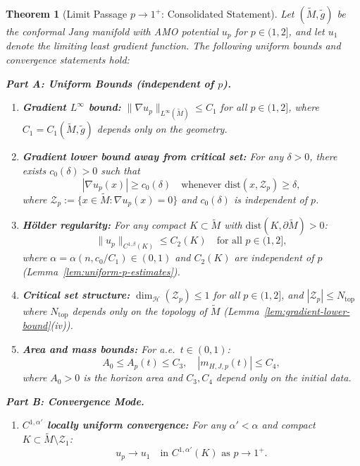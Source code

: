 \documentclass[12pt]{article}
\theoremstyle{plain}
\newtheorem{theorem}{Theorem}[section]
\theoremstyle{definition}
\theoremstyle{remark}
\newcommand{\tM}{\tilde{M}}
\newcommand{\tg}{\tilde{g}}
\begin{document}
\begin{theorem}[Limit Passage $p \to 1^+$: Consolidated Statement]\label{thm:limit-passage}
Let $(\tM, \tg)$ be the conformal Jang manifold with AMO potential $u_p$ for $p \in (1, 2]$, and let $u_1$ denote the limiting least gradient function. The following uniform bounds and convergence statements hold:

\smallskip
\noindent\textbf{Part A: Uniform Bounds (independent of $p$).}
\begin{enumerate}
    \item[(U1)] \textbf{Gradient $L^\infty$ bound:} $\|\nabla u_p\|_{L^\infty(\tM)} \leq C_1$ for all $p \in (1, 2]$, where $C_1 = C_1(\tM, \tg)$ depends only on the geometry.
    
    \item[(U2)] \textbf{Gradient lower bound away from critical set:} For any $\delta > 0$, there exists $c_0(\delta) > 0$ such that
    \[
    |\nabla u_p(x)| \geq c_0(\delta) \quad \text{whenever } \mathrm{dist}(x, \mathcal{Z}_p) \geq \delta,
    \]
    where $\mathcal{Z}_p := \{x \in \tM : \nabla u_p(x) = 0\}$ and $c_0(\delta)$ is independent of $p$.
    
    \item[(U3)] \textbf{H\"older regularity:} For any compact $K \subset \tM$ with $\mathrm{dist}(K, \partial\tM) > 0$:
    \[
    \|u_p\|_{C^{1,\beta}(K)} \leq C_2(K) \quad \text{for all } p \in (1, 2],
    \]
    where $\alpha = \alpha(n, c_0/C_1) \in (0, 1)$ and $C_2(K)$ are independent of $p$ (Lemma~\ref{lem:uniform-p-estimates}).
    
    \item[(U4)] \textbf{Critical set structure:} $\dim_{\mathcal{H}}(\mathcal{Z}_p) \leq 1$ for all $p \in (1, 2]$, and $|\mathcal{Z}_p| \leq N_{\mathrm{top}}$ where $N_{\mathrm{top}}$ depends only on the topology of $\tM$ (Lemma~\ref{lem:gradient-lower-bound}(iv)).
    
    \item[(U5)] \textbf{Area and mass bounds:} For a.e.\ $t \in (0, 1)$:
    \[
    A_0 \leq A_p(t) \leq C_3, \quad |m_{H,J,p}(t)| \leq C_4,
    \]
    where $A_0 > 0$ is the horizon area and $C_3, C_4$ depend only on the initial data.
\end{enumerate}

\smallskip
\noindent\textbf{Part B: Convergence Mode.}
\begin{enumerate}
    \item[(C1)] \textbf{$C^{1,\alpha'}$ locally uniform convergence:} For any $\alpha' < \alpha$ and compact $K \subset \tM \setminus \mathcal{Z}_1$:
    \[
    u_p \to u_1 \quad \text{in } C^{1,\alpha'}(K) \text{ as } p \to 1^+.
    \]
    

\end{enumerate}
\end{theorem}
\end{document}

